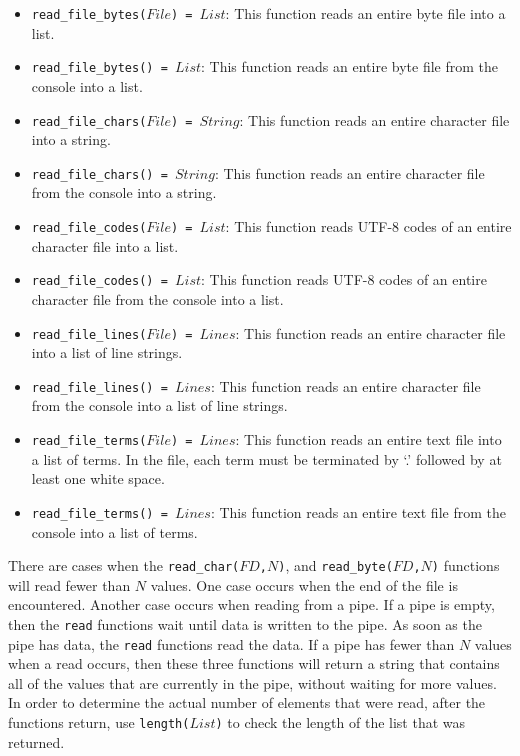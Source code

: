 \begin{itemize}
\item \texttt{read\_file\_bytes($File$) = $List$}: This function reads an entire byte file into a list. 
\item \texttt{read\_file\_bytes() = $List$}: This function reads an entire byte file from the console into a list.
\item \texttt{read\_file\_chars($File$) = $String$}: This function reads an entire character file into a string. 
\item \texttt{read\_file\_chars() = $String$}: This function reads an entire character file from the console into a string. 
\item \texttt{read\_file\_codes($File$) = $List$}: This function reads UTF-8 codes of an entire character file into a list. 
\item \texttt{read\_file\_codes() = $List$}: This function reads UTF-8 codes of an entire character file from the console into a list. 
\item \texttt{read\_file\_lines($File$) = $Lines$}: This function reads an entire character file into a list of line strings.  
\item \texttt{read\_file\_lines() = $Lines$}: This function reads an entire character file from the console into a list of line strings.  
\item \texttt{read\_file\_terms($File$) = $Lines$}: This function reads an entire text file into a list of terms. In the file, each term must be terminated by `.' followed by at least one white space.
\item \texttt{read\_file\_terms() = $Lines$}: This function reads an entire text file from the console into a list of terms.
\end{itemize}

There are cases when the \texttt{read\_char($FD$,$N$)}, and \texttt{read\_byte($FD$,$N$)} functions will read fewer than $N$ values.  One case occurs when the end of the file is encountered.  Another case occurs when reading from a pipe.  If a pipe is empty, then the \texttt{read} functions wait until data is written to the pipe.  As soon as the pipe has data, the \texttt{read} functions read the data.  If a pipe has fewer than $N$ values when a read occurs, then these three functions will return a string that contains all of the values that are currently in the pipe, without waiting for more values.  In order to determine the actual number of elements that were read, after the functions return, use \texttt{length($List$)} to check the length of the list that was returned.

